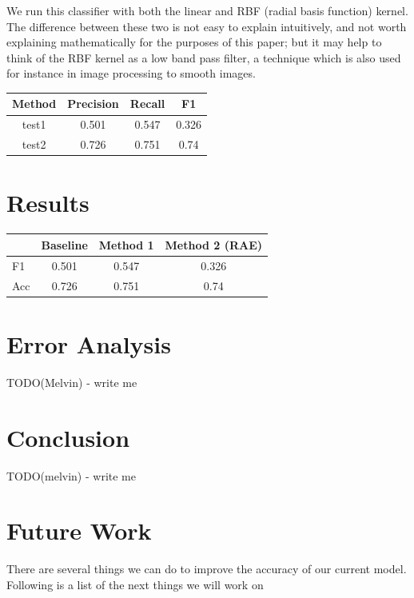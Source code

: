 \documentclass[conference]{IEEEtran}
\begin{document}
We run this classifier with both the linear and RBF (radial basis function) kernel.  The difference between these two is not easy to explain intuitively, and not worth explaining mathematically for the purposes of this paper; but it may help to think of the RBF kernel as a low band pass filter, a technique which is also used for instance in image processing to smooth images. \cite{RBF}

\begin{center}
\begin{tabular}{| c | c | c | c |}
\hline
 Method & Precision & Recall & F1 \\ \hline
test1 & 0.501 & 0.547 & 0.326 \\ \hline
 test2 & 0.726 & 0.751 & 0.74 \\ 
 \hline
\end{tabular}
\end{center}

\section{Results}
\begin{center}
\begin{tabular}{|l | c | c | c|}
\hline
 & Baseline & Method 1 & Method 2 (RAE) \\ \hline
 F1 & 0.501 & 0.547 & 0.326 \\ \hline
 Acc & 0.726 & 0.751 & 0.74 \\ 
 \hline
\end{tabular}
\end{center}


\section{Error Analysis}
TODO(Melvin) - write me

\section{Conclusion}
TODO(melvin) - write me

\section{Future Work}
There are several things we can do to improve the accuracy of our current model.  Following is a list of the next things we will work on




\end{document}
